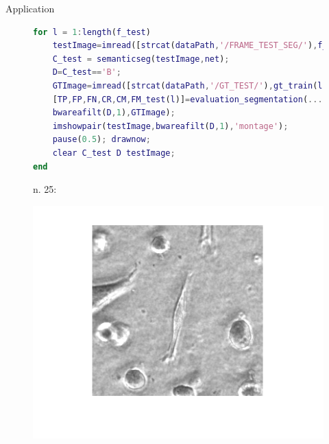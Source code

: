 \documentclass[aspectratio=169,xcolor=dvipsnames]{beamer}
\begin{document}
\begin{frame}[fragile]{Application}
	\begin{figure}
		\begin{minipage}{0.69\linewidth}
	\tiny{\begin{lstlisting}[language=Matlab,basicstyle=\tiny]
for l = 1:length(f_test)
	testImage=imread([strcat(dataPath,'/FRAME_TEST_SEG/'),f_test(l).name]);
	C_test = semanticseg(testImage,net);
	D=C_test=='B';
	GTImage=imread([strcat(dataPath,'/GT_TEST/'),gt_train(l).name]);
	[TP,FP,FN,CR,CM,FM_test(l)]=evaluation_segmentation(...
	bwareafilt(D,1),GTImage);
	imshowpair(testImage,bwareafilt(D,1),'montage');
	pause(0.5); drawnow;
	clear C_test D testImage;
end
\end{lstlisting}}
		\end{minipage}\hfill
	\begin{minipage}{0.3\linewidth}
			\fontsize{3}{4}
	\end{minipage}
\centering
\tiny{n. 25:}\\
\begin{minipage}{0.25\linewidth}
	\includegraphics[width=\linewidth]{n25.png}
\end{minipage}\hfill
\begin{minipage}{0.25\linewidth}

\end{minipage}
\end{figure}
\end{frame}
\end{document}
